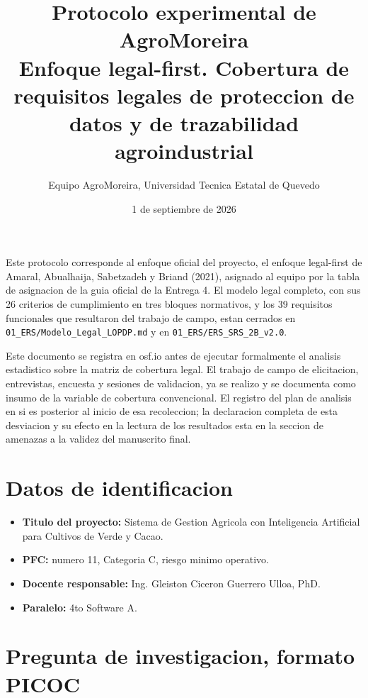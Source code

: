 \documentclass[11pt,a4paper]{article}
\title{Protocolo experimental de AgroMoreira\\[4pt]
\large Enfoque legal-first. Cobertura de requisitos legales de proteccion de datos y de trazabilidad agroindustrial}
\author{Equipo AgroMoreira, Universidad Tecnica Estatal de Quevedo}
\date{1 de septiembre de 2026}
\begin{document}
\maketitle

Este protocolo corresponde al enfoque oficial del proyecto, el enfoque legal-first de Amaral, Abualhaija, Sabetzadeh y Briand (2021), asignado al equipo por la tabla de asignacion de la guia oficial de la Entrega 4. El modelo legal completo, con sus 26 criterios de cumplimiento en tres bloques normativos, y los 39 requisitos funcionales que resultaron del trabajo de campo, estan cerrados en \texttt{01\_ERS/Modelo\_Legal\_LOPDP.md} y en \texttt{01\_ERS/ERS\_SRS\_2B\_v2.0}.

Este documento se registra en osf.io antes de ejecutar formalmente el analisis estadistico sobre la matriz de cobertura legal. El trabajo de campo de elicitacion, entrevistas, encuesta y sesiones de validacion, ya se realizo y se documenta como insumo de la variable de cobertura convencional. El registro del plan de analisis en si es posterior al inicio de esa recoleccion; la declaracion completa de esta desviacion y su efecto en la lectura de los resultados esta en la seccion de amenazas a la validez del manuscrito final.

\tableofcontents

\section{Datos de identificacion}

\begin{itemize}
\item \textbf{Titulo del proyecto:} Sistema de Gestion Agricola con Inteligencia Artificial para Cultivos de Verde y Cacao.
\item \textbf{PFC:} numero 11, Categoria C, riesgo minimo operativo.
\item \textbf{Docente responsable:} Ing. Gleiston Ciceron Guerrero Ulloa, PhD.
\item \textbf{Paralelo:} 4to Software A.
\end{itemize}

\section{Pregunta de investigacion, formato PICOC}
\end{document}
